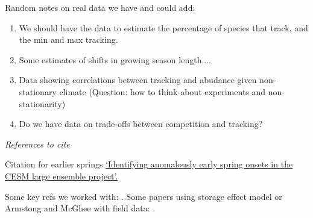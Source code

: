 \documentclass[11pt,letterpaper]{article}
\renewcommand{\subsection}[1]{%
\bigskip
\begin{center}
\begin{large}
\normalfont\itshape #1
\end{large}
\end{center}}
\begin{document}
Random notes on real data we have and could add:
\begin{enumerate}
\item We should have the data to estimate the
percentage of species that track, and the min and max tracking.
\item Some estimates of shifts in growing season length....
\item Data showing correlations between tracking and abudance given non-stationary climate (Question: how to think about experiments and non-stationarity)
\item Do we have data on trade-offs between competition and tracking? 
\end{enumerate}

\subsection{References to cite}
\noindent Citation for earlier springs \href{https://link.springer.com/article/10.1007/s00382-016-3313-2}{`Identifying anomalously early spring onsets in the CESM large ensemble project'.}

\noindent Some key refs we worked with:
\citep{Chesson:1993gi,Chesson:2000ak,Chesson:2000vd,Chesson:2004eo}. Some
papers using storage effect model or Armstong and McGhee with field
data: \citep{Angert:2009,Kuang:2008ri,Kuang:2009rj,Levine:2009ym}.
\end{document}
